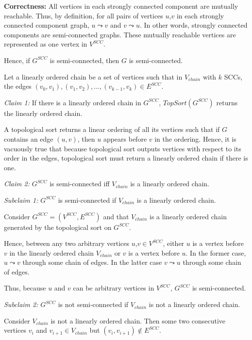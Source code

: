 \documentclass[a4paper]{report}
\begin{document}
\begin{enumerate}
      {\bf Correctness:}
      All vertices in each strongly connected component are mutually reachable. 
      Thus, by definition, for all pairs of vertices $u$,$v$ in each strongly connected component graph, $u \leadsto v$ and $v \leadsto u$. 
      In other words, strongly connected components are semi-connected graphs. 
      These mutually reachable vertices are represented as one vertex in $V^{SCC}$. 

      Hence, if $G^{SCC}$ is semi-connected, then $G$ is semi-connected. 
      
      Let a linearly ordered chain be a set of vertices such that in $V_{chain}$ with $k$ SCCs, the
      edges $(v_{0}, v_{1}), (v_{1},v_{2}),\dots,(v_{k-1},v_{k}) \in E^{SCC}$.

      {\it Claim 1:} If there is a linearly ordered chain in $G^{SCC}$, $TopSort(G^{SCC})$ returns the linearly ordered chain. 

      A topological sort returns a linear ordering of all its vertices such that if $G$ contains an edge $(u,v)$, then $u$
      appears before $v$ in the ordering. Hence, it is vacuously true that because topological sort outputs vertices with respect 
      to its order in the edges, topological sort must return a linearly ordered chain if there is one. 

      {\it Claim 2:} $G^{SCC}$ is semi-connected iff $V_{chain}$ is a linearly ordered chain. 

      {\it Subclaim 1:} $G^{SCC}$ is semi-connected if $V_{chain}$ is a linearly ordered chain. 

      Consider $G^{SCC}=(V^{SCC}, E^{SCC})$ and that $V_{chain}$ is a linearly ordered chain generated by the topological sort on $G^{SCC}$. 

      Hence, between any two arbitrary vertices $u$,$v \in V^{SCC}$, either $u$ is a vertex before $v$ in the linearly ordered chain $V_{chain}$ or
      $v$ is a vertex before $u$. In the former case, $u \leadsto v$ through some chain of edges. In the latter case $v \leadsto u$ through some chain of edges. 

      Thus, because $u$ and $v$ can be arbitrary vertices in $V^{SCC}$, $G^{SCC}$ is semi-connected. 


      {\it Subclaim 2:} $G^{SCC}$ is not semi-connected if $V_{chain}$ is not a linearly ordered chain. 

      Consider $V_{chain}$ is not a linearly ordered chain. Then some two consecutive vertices $v_{i}$ and 
      $v_{i+1} \in V_{chain}$ but $(v_{i}, v_{i+1}) \not\in E^{SCC}$. 


\end{enumerate}
\end{document}
